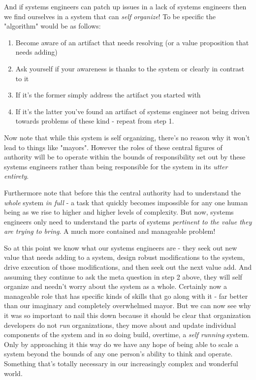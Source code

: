 \documentclass[11pt,a5paper]{book}
\begin{document}
And if systems engineers can patch up issues in a lack of systems engineers then we find ourselves in a system that can \textit{self organize}! To be specific the "algorithm" would be as follows:

\begin{enumerate}
\item Become aware of an artifact that needs resolving (or a value proposition that needs adding)
\item Ask yourself if your awareness is thanks to the system or clearly in contrast to it
\item If it's the former simply address the artifact you started with
\item If it's the latter you've found an artifact of systems engineer not being driven towards problems of these kind - repeat from step 1.
\end{enumerate}

Now note that while this system is self organizing, there's no reason why it won't lead to things like "mayors". However the roles of these central figures of authority will be to operate within the bounds of responsibility set out by these systems engineers rather than being responsible for the system in its \textit{utter entirety}.
\newline

Furthermore note that before this the central authority had to understand the \textit{whole} system \textit{in full} - a task that quickly becomes impossible for any one human being as we rise to higher and higher levels of complexity. But now, systems engineers only need to understand the parts of systems \textit{pertinent to the value they are trying to bring}. A much more contained and manageable problem!
\newline 

So at this point we know what our systems engineers are - they seek out new value that needs adding to a system, design robust modifications to the system, drive execution of those modifications, and then seek out the next value add. And assuming they continue to ask the meta question in step 2 above, they will self organize and needn't worry about the system as a whole. Certainly now a manageable role that has specific kinds of skills that go along with it - far better than our imaginary and completely overwhelmed mayor. But we can now see why it was so important to nail this down because it should be clear that organization developers do not \textit{run} organizations, they move about and update individual components of the system and in so doing build, overtime, a \textit{self running} system. Only by approaching it this way do we have any hope of being able to scale a system beyond the bounds of any one person's ability to think and operate. Something that's totally necessary in our increasingly complex and wonderful world. 
\end{document}

